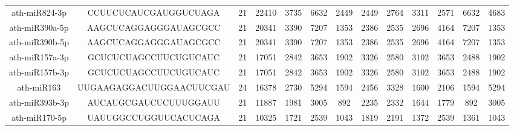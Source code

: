 \begin{landscape}
\begin{table}[]
\begin{tabular}{ccccccccccccc}
    ath-miR824-3p    & CCUUCUCAUCGAUGGUCUAGA    & 21           & 22410        & 3735             & 6632         & 2449                         & 2449                 & 2764                 & 3311                  & 2571                  & 6632                  & 4683                  \\
    ath-miR390a-5p   & AAGCUCAGGAGGGAUAGCGCC    & 21           & 20341        & 3390             & 7207         & 1353                         & 2386                 & 2535                 & 2696                  & 4164                  & 7207                  & 1353                  \\
    ath-miR390b-5p   & AAGCUCAGGAGGGAUAGCGCC    & 21           & 20341        & 3390             & 7207         & 1353                         & 2386                 & 2535                 & 2696                  & 4164                  & 7207                  & 1353                  \\
    ath-miR157a-3p   & GCUCUCUAGCCUUCUGUCAUC    & 21           & 17051        & 2842             & 3653         & 1902                         & 3326                 & 2580                 & 3102                  & 3653                  & 2488                  & 1902                  \\
    ath-miR157b-3p   & GCUCUCUAGCCUUCUGUCAUC    & 21           & 17051        & 2842             & 3653         & 1902                         & 3326                 & 2580                 & 3102                  & 3653                  & 2488                  & 1902                  \\
    ath-miR163       & UUGAAGAGGACUUGGAACUUCGAU & 24           & 16378        & 2730             & 5294         & 1594                         & 2456                 & 3328                 & 1600                  & 2106                  & 1594                  & 5294                  \\
    ath-miR393b-3p   & AUCAUGCGAUCUCUUUGGAUU    & 21           & 11887        & 1981             & 3005         & 892                          & 2235                 & 2332                 & 1644                  & 1779                  & 892                   & 3005                  \\
    ath-miR170-5p    & UAUUGGCCUGGUUCACUCAGA    & 21           & 10325        & 1721             & 2539         & 1043                         & 1819                 & 2191                 & 1372                  & 2539                  & 1361                  & 1043                  \\

\end{tabular}
\end{table}
\end{landscape}
